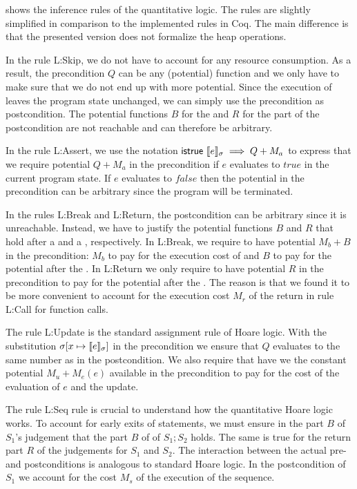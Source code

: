 \documentclass{sigplanconf}
\newcommand{\pref}[1]{\prettyref{#1}}
\begin{document}
{\pref{fig:logicapp} shows the inference rules of the quantitative logic.
The rules are slightly simplified in comparison to the implemented
rules in Coq.  The main difference is that the presented version does
not formalize the heap operations.

In the rule {\sc L:Skip}, we do not have to account for any resource
consumption.  As a result, the precondition $Q$ can be any (potential)
function and we only have to make sure that we do not end up with more
potential.  Since the execution of  leaves the program
state unchanged, we can simply use the precondition as postcondition.
The potential functions $B$ for the  and $R$ for the
 part of the postcondition are not reachable and can
therefore be arbitrary.

In the rule {\sc L:Assert}, we use the notation
$\mathsf{istrue}~\llbracket e \rrbracket_{\sigma} \implies Q + M_a$ to express that we
require potential $Q + M_a$ in the precondition if $e$ evaluates to
$\mathit{true}$ in the current program state.  If $e$ evaluates to
$\mathit{false}$ then the potential in the precondition can be
arbitrary since the program will be terminated.

In the rules {\sc L:Break} and {\sc L:Return}, the postcondition can
be arbitrary since it is unreachable.  Instead, we have to justify the
potential functions $B$ and $R$ that hold after a  and a
, respectively.  In {\sc L:Break}, we require to have
potential $M_b+B$ in the precondition: $M_b$ to pay for the execution
cost of  and $B$ to pay for the potential after the
.  In {\sc L:Return} we only require to have potential
$R$ in the precondition to pay for the potential after the
.  The reason is that we found it to be more convenient
to account for the execution cost $M_r$ of the return in rule {\sc
  L:Call} for function calls.

The rule {\sc L:Update} is the standard assignment rule of Hoare
logic.  With the substitution $\sigma[x \mapsto \llbracket e \rrbracket_{\sigma}]$ in
the precondition we ensure that $Q$ evaluates to the same number as in
the postcondition.  We also require that have we the constant
potential $M_u + M_e(e)$ available in the precondition to pay for the
cost of the evaluation of $e$ and the update.

The rule {\sc L:Seq} rule is crucial to understand how the
quantitative Hoare logic works.  To account for early exits of
statements, we must ensure in the  part $B$ of $S_1$'s
judgement that the  part $B$ of of $S_1;S_2$ holds. The
same is true for the return part $R$ of the judgements for $S_1$ and
$S_2$.  The interaction between the actual pre- and postconditions is
analogous to standard Hoare logic.  In the postcondition of $S_1$ we
account for the cost $M_s$ of the execution of the sequence.

}
\end{document}
